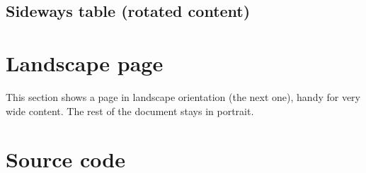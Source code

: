 \subsection{Sideways table (rotated content)}

\begin{table}[H]
  \centering
  \caption{A table with its content rotated 90° in place (\texttt{\textbackslash rotatebox})}
  \label{tab:sideways}
\end{table}

\section{Landscape page}

This section shows a page in landscape orientation (the next one), handy for
very wide content. The rest of the document stays in portrait.

\begin{tfglandscape}
\lipsum[1]
\end{tfglandscape}



\section{Source code}

